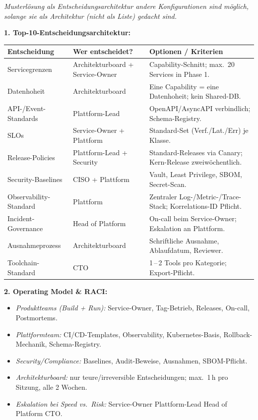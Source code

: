 \documentclass[11pt,a4paper,oneside]{article}
\begin{document}
\begin{loesungbox}
\emph{Musterl\"osung als Entscheidungsarchitektur \textendash{} andere Konfigurationen sind m\"oglich, solange sie als Architektur (nicht als Liste) gedacht sind.}

\smallskip
\textbf{1. Top-10-Entscheidungsarchitektur:}

\smallskip
\begin{tabularx}{\linewidth}{@{}p{3.8cm}p{3.6cm}X@{}}
\toprule
\textbf{Entscheidung} & \textbf{Wer entscheidet?} & \textbf{Optionen / Kriterien} \\
\midrule
Servicegrenzen          & Architekturboard + Service-Owner & Capability-Schnitt; max.\ 20 Services in Phase 1. \\
Datenhoheit             & Architekturboard                & Eine Capability = eine Datenhoheit; kein Shared-DB. \\
API-/Event-Standards    & Plattform-Lead                  & OpenAPI/AsyncAPI verbindlich; Schema-Registry. \\
SLOs                    & Service-Owner + Plattform       & Standard-Set (Verf./Lat./Err) je Klasse. \\
Release-Policies        & Plattform-Lead + Security       & Standard-Releases via Canary; Kern-Release zweiw\"ochentlich. \\
Security-Baselines      & CISO + Plattform                & Vault, Least Privilege, SBOM, Secret-Scan. \\
Observability-Standard  & Plattform                        & Zentraler Log-/Metric-/Trace-Stack; Korrelations-ID Pflicht. \\
Incident-Governance     & Head of Platform                 & On-call beim Service-Owner; Eskalation an Plattform. \\
Ausnahmeprozess         & Architekturboard                 & Schriftliche Ausnahme, Ablaufdatum, Reviewer. \\
Toolchain-Standard      & CTO                              & 1\,--\,2 Tools pro Kategorie; Export-Pflicht. \\
\bottomrule
\end{tabularx}

\smallskip
\textbf{2. Operating Model \& RACI:}
\begin{itemize}
  \item \emph{Produktteams (Build + Run):} Service-Owner, Tag-Betrieb, Releases, On-call, Postmortems.
  \item \emph{Plattformteam:} CI/CD-Templates, Observability, Kubernetes-Basis, Rollback-Mechanik, Schema-Registry.
  \item \emph{Security/Compliance:} Baselines, Audit-Beweise, Ausnahmen, SBOM-Pflicht.
  \item \emph{Architekturboard:} nur teure/irreversible Entscheidungen; max.\ 1\,h pro Sitzung, alle 2 Wochen.
  \item \emph{Eskalation bei Speed vs.\ Risk:} Service-Owner \textrightarrow{} Plattform-Lead \textrightarrow{} Head of Platform \textrightarrow{} CTO.
\end{itemize}


\end{loesungbox}
\end{document}

